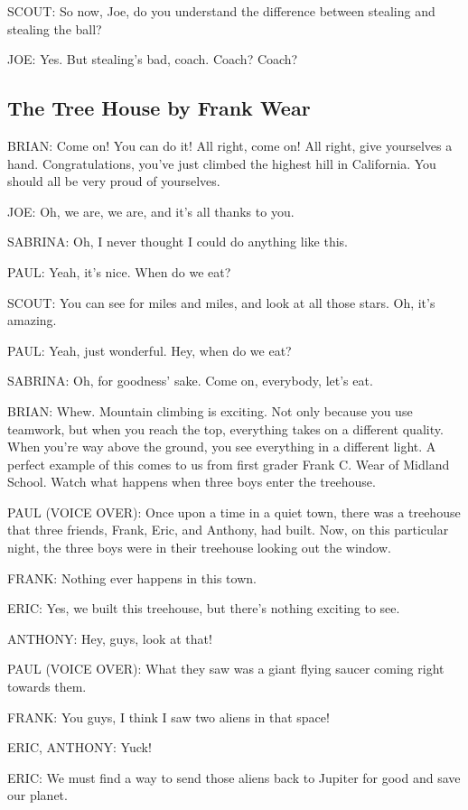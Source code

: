 SCOUT:
So now, Joe, do you understand the difference between stealing and stealing the ball?

JOE:
Yes.
But stealing's bad, coach.
Coach? Coach?

\subsection{The Tree House by Frank Wear}

BRIAN:
Come on!
You can do it!
All right, come on!
All right, give yourselves a hand.
Congratulations, you've just climbed the highest hill in California.
You should all be very proud of yourselves.

JOE:
Oh, we are, we are, and it's all thanks  to you.

SABRINA:
Oh, I never thought I could do anything like this.

PAUL:
Yeah, it's nice.
When do we eat?

SCOUT:
You can see for miles and miles, and look at all those stars.
Oh, it's amazing.

PAUL:
Yeah, just wonderful.
Hey, when do we eat?

SABRINA:
Oh, for goodness' sake.
Come on, everybody, let's eat.

BRIAN:
Whew.
Mountain climbing is exciting.
Not only because you use teamwork, but when you reach the top, everything takes on a different quality.
When you're way above the ground, you see everything in a different light.
A perfect example of this comes to us from first grader Frank C. Wear of Midland School.
Watch what happens when three boys enter the treehouse.

PAUL (VOICE OVER):
Once upon a time in a quiet town, there was a treehouse that three friends, Frank, Eric, and Anthony, had built.
Now, on this particular night, the three boys were in their treehouse looking out the window.

FRANK:
Nothing ever happens in this town.

ERIC:
Yes, we built this treehouse, but there's nothing exciting to see.

ANTHONY:
Hey, guys, look at that!

PAUL (VOICE OVER):
What they saw was a giant flying saucer coming right towards them.

FRANK:
You guys, I think I saw two aliens in that space!

ERIC, ANTHONY:
Yuck!

ERIC:
We must find a way to send those aliens back to Jupiter for good and save our planet.

